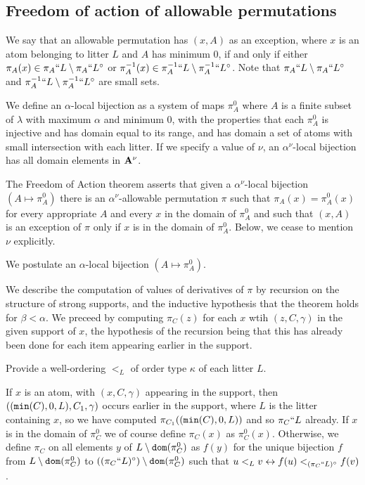 \documentclass[12pt]{article}
\begin{document}
\subsection{Freedom of action of allowable permutations}

We say that an allowable permutation has $(x,A)$ as an exception, where $x$ is an atom belonging to litter $L$ and  $A$ has minimum 0, if and only if  either $\pi_A(x) \in \pi_A``L \setminus \pi_A``L^\circ$ or $\pi^{-1}_A(x) \in \pi_A^{-1}``L \setminus \pi^{-1}_A``L^\circ$.  Note that $\pi_A``L \setminus \pi_A``L^\circ$ and $\pi_A^{-1}``L \setminus \pi^{-1}_A``L^\circ$ are small sets.


We define an $\alpha$-local bijection as a system of maps $\pi^0_A$ where $A$ is a finite subset of $\lambda$ with maximum $\alpha$ and minimum 0, with the properties that each $\pi^0_A$ is injective and has domain equal to its range, and has domain a set of atoms with small intersection with each litter.  If we specify a value of $\nu$,
an $\alpha^\nu$-local bijection has all domain elements in ${\bf A}^\nu$.

The Freedom of Action theorem asserts that given a $\alpha^\nu$-local bijection $(A \mapsto \pi^0_A)$  there is an $\alpha^\nu$-allowable permutation $\pi$ such that $\pi_A(x) = \pi^0_A(x)$ for every appropriate $A$ and every $x$ in the domain of $\pi^0_A$  and such that $(x,A)$ is an exception of $\pi$ only if $x$ is in the domain of $\pi^0_A$.  Below, we cease to mention $\nu$ explicitly.

We postulate an $\alpha$-local bijection $(A \mapsto \pi^0_A)$.

We describe the computation of values of derivatives of $\pi$ by recursion on the structure of strong supports, and the inductive hypothesis that the theorem holds for $\beta<\alpha$.  We preceed by computing $\pi_C(z)$ for each $x$ wtih
$(z,C,\gamma)$ in the given support of $x$, the hypothesis of the recursion being that this has already been done for each item appearing earlier in the support.

Provide a well-ordering $<_L$ of order type $\kappa$ of each litter $L$.

If $x$ is an atom, with $(x,C,\gamma)$ appearing in the support, then $(({\tt min}(C),0,L),C_1,\gamma)$ occurs earlier in the support, where $L$ is the litter containing $x$, so we have computed $\pi_{C_1}(({\tt min}(C),0,L))$ and so $\pi_C``L$ already.
If $x$ is in the domain of $\pi^0_C$ we of course define $\pi_C(x)$ as $\pi^0_C(x)$.  Otherwise, we define $\pi_C$ on all elements $y$ of $L \setminus {\tt dom}(\pi^0_C)$ as $f(y)$ for the unique bijection $f$ from $L \setminus {\tt dom}(\pi^0_C)$ to
$((\pi_C``L)^\circ) \setminus {\tt dom}(\pi^0_C)$ such that $u <_L v \leftrightarrow f(u)<_{(\pi_C``L)^\circ} f(v)$.
\end{document}
